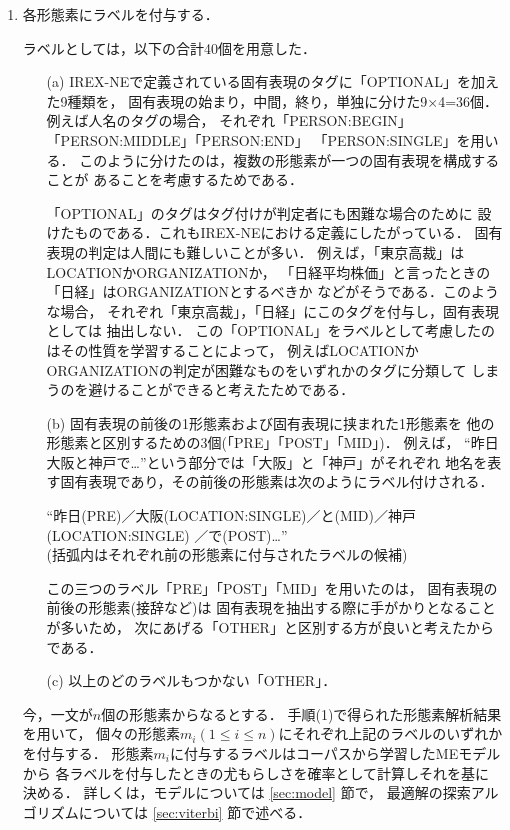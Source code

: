 \begin{enumerate}
\item 各形態素にラベルを付与する．

  ラベルとしては，以下の合計40個を用意した．
  \begin{enumerate}
  \item[(a)] 
    IREX-NEで定義されている固有表現のタグに「OPTIONAL」を加えた9種類を，
    固有表現の始まり，中間，終り，単独に分けた9$\times$4=36個．
    例えば人名のタグの場合，
    それぞれ「PERSON:BEGIN」「PERSON:MIDDLE」「PERSON:END」
    「PERSON:SINGLE」を用いる．
    このように分けたのは，複数の形態素が一つの固有表現を構成することが
    あることを考慮するためである．

    「OPTIONAL」のタグはタグ付けが判定者にも困難な場合のために
    設けたものである．これもIREX-NEにおける定義にしたがっている．
    固有表現の判定は人間にも難しいことが多い．
    例えば，「東京高裁」はLOCATIONかORGANIZATIONか，
    「日経平均株価」と言ったときの「日経」はORGANIZATIONとするべきか
    などがそうである．このような場合，
    それぞれ「東京高裁」，「日経」にこのタグを付与し，固有表現としては
    抽出しない．
    この「OPTIONAL」をラベルとして考慮したのはその性質を学習することによって，
    例えばLOCATIONかORGANIZATIONの判定が困難なものをいずれかのタグに分類して
    しまうのを避けることができると考えたためである．
    
  \item[(b)] 固有表現の前後の1形態素および固有表現に挟まれた1形態素を
    他の形態素と区別するための3個(「PRE」「POST」「MID」)．
    例えば，
    ``昨日大阪と神戸で…''という部分では「大阪」と「神戸」がそれぞれ
    地名を表す固有表現であり，その前後の形態素は次のようにラベル付けされる．
    \begin{flushleft}
      ``昨日(PRE)／大阪(LOCATION:SINGLE)／と(MID)／神戸(LOCATION:SINGLE)
      ／で(POST)…''\\
      (括弧内はそれぞれ前の形態素に付与されたラベルの候補)
    \end{flushleft}
    この三つのラベル「PRE」「POST」「MID」を用いたのは，
    固有表現の前後の形態素(接辞など)は
    固有表現を抽出する際に手がかりとなることが多いため，
    次にあげる「OTHER」と区別する方が良いと考えたからである．
  \item[(c)] 以上のどのラベルもつかない「OTHER」．
  \end{enumerate}

  今，一文が$n$個の形態素からなるとする．
  手順(1)で得られた形態素解析結果を用いて，
  個々の形態素$m_i (1\leq i\leq n)$にそれぞれ上記のラベルのいずれかを付与する．
  形態素$m_i$に付与するラベルはコーパスから学習したMEモデルから
  各ラベルを付与したときの尤もらしさを確率として計算しそれを基に決める．
  詳しくは，モデルについては \ref{sec:model} 節で，
  最適解の探索アルゴリズムについては \ref{sec:viterbi} 節で述べる．
  


\end{enumerate}
